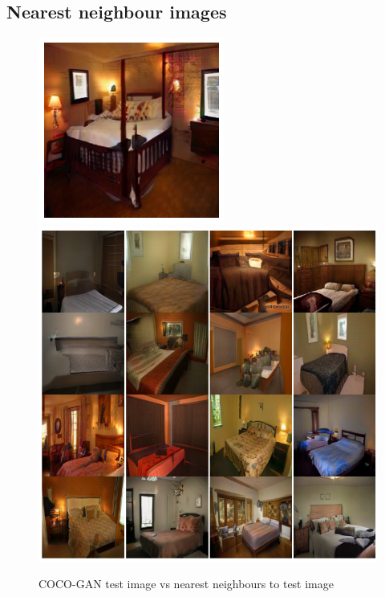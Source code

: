\documentclass{article}
\begin{document}
    \subsection{Nearest neighbour images}
    \begin{figure}[H]
          \centering
          \includegraphics[scale=0.5]{nearest-neighbour/coco_test_image.png}
          \ \ 
          \includegraphics[scale=0.3]{nearest-neighbour/coco_nearest_images.png}\\
          \caption{COCO-GAN test image vs nearest neighbours to test image}
    \end{figure}
\end{document}
